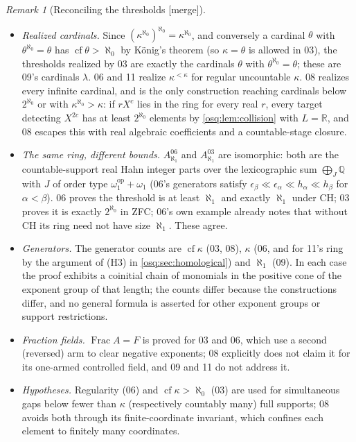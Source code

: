 \documentclass[11pt,letterpaper]{article}
\numberwithin{equation}{section}
\theoremstyle{definition}
\theoremstyle{remark}
\newtheorem{remark}[remark]{Remark}
\theoremstyle{plain}
\newcommand{\Q}{\mathbb Q}
\newcommand{\R}{\mathbb R}
\newcommand{\Frac}{\operatorname{Frac}}
\newcommand{\cf}{\operatorname{cf}}
\newcommand{\merge}{\textup{\textsf{[merge]}}}
\begin{document}
\begin{remark}[Reconciling the thresholds \merge]\label{osq:rem:reconcile}
\leavevmode
\begin{itemize}
\item \emph{Realized cardinals.} Since $(\kappa^{\aleph_0})^{\aleph_0}=\kappa^{\aleph_0}$, and
conversely a cardinal $\theta$ with $\theta^{\aleph_0}=\theta$ has $\cf\theta>\aleph_0$ by
K\"onig's theorem (so $\kappa=\theta$ is allowed in 03), the thresholds realized by 03 are
exactly the cardinals $\theta$ with $\theta^{\aleph_0}=\theta$; these are 09's cardinals
$\lambda$. 06 and 11 realize $\kappa^{<\kappa}$ for regular uncountable $\kappa$. 08 realizes every
infinite cardinal, and is the only construction reaching cardinals below $2^{\aleph_0}$ or with
$\kappa^{\aleph_0}>\kappa$: if $rX^c$ lies in the ring for every real $r$, every target detecting $X^{2c}$ has at least
$2^{\aleph_0}$ elements by \cref{osq:lem:collision} with $L=\R$, and 08 escapes this with real
algebraic coefficients and a countable-stage closure.
\item \emph{The same ring, different bounds.} $A^{06}_{\aleph_1}$ and $A^{03}_{\aleph_1}$ are
isomorphic: both are the countable-support real Hahn integer parts over the lexicographic sum
$\bigoplus_J\Q$ with $J$ of order type $\omega_1^{\mathrm{op}}+\omega_1$ (06's generators satisfy
$\epsilon_\beta\ll\epsilon_\alpha\ll h_\alpha\ll h_\beta$ for $\alpha<\beta$). 06 proves the
threshold is at least $\aleph_1$ and exactly $\aleph_1$ under CH; 03 proves it is exactly
$2^{\aleph_0}$ in ZFC; 06's own example already notes that without CH its ring need not have size
$\aleph_1$. These agree.
\item \emph{Generators.} The generator counts are $\cf\kappa$ (03, 08), $\kappa$ (06, and for
11's ring by the argument of (H3) in \cref{osq:sec:homological}) and $\aleph_1$ (09). In each case the proof exhibits a coinitial chain of monomials in the positive
cone of the exponent group of that length; the counts differ because the constructions differ,
and no general formula is asserted for other exponent groups or support restrictions.
\item \emph{Fraction fields.} $\Frac A=F$ is proved for 03 and 06, which use a second
(reversed) arm to clear negative exponents; 08 explicitly does not claim it for its one-armed
controlled field, and 09 and 11 do not address it.
\item \emph{Hypotheses.} Regularity (06) and $\cf\kappa>\aleph_0$ (03) are used for simultaneous
gaps below fewer than $\kappa$ (respectively countably many) full supports; 08 avoids both through
its finite-coordinate invariant, which confines each element to finitely many coordinates.
\end{itemize}
\end{remark}
\end{document}
